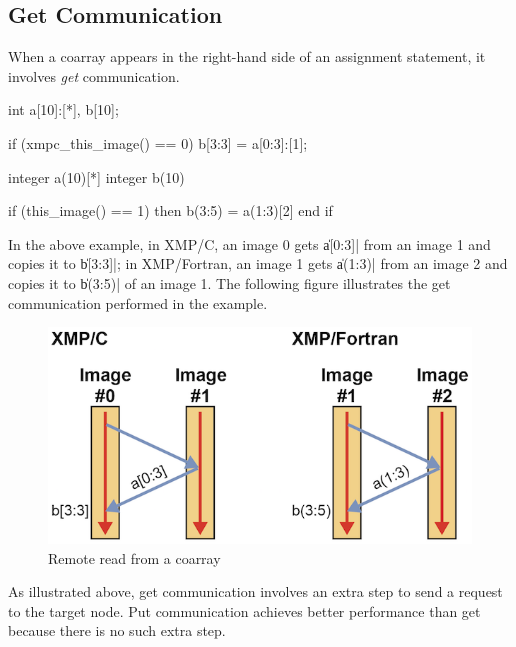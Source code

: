 

\subsection{Get Communication}

When a coarray appears in the right-hand side of an assignment
statement, it involves {\it get} communication.

\begin{XCexample}
int a[10]:[*], b[10];

if (xmpc_this_image() == 0)
  b[3:3] = a[0:3]:[1];
\end{XCexample}

\begin{XFexample}
integer a(10)[*]
integer b(10)

if (this_image() == 1) then
  b(3:5) = a(1:3)[2]
end if
\end{XFexample}

In the above example, in XMP/C, an image 0 gets \|a[0:3]| from an image
1 and copies it to \|b[3:3]|; in XMP/Fortran, an image 1 gets \|a(1:3)|
from an image 2 and copies it to \|b(3:5)| of an image 1. The following
figure illustrates the get communication performed in the example.

\begin{figure}
  \centering
  \includegraphics[width=\textwidth]{figs/get.png}
  \caption{Remote read from a coarray}
\end{figure}

\begin{myhint}
  As illustrated above, get communication involves an extra step to send
  a request to the target node. Put communication achieves better
  performance than get because there is no such extra step.
\end{myhint}


